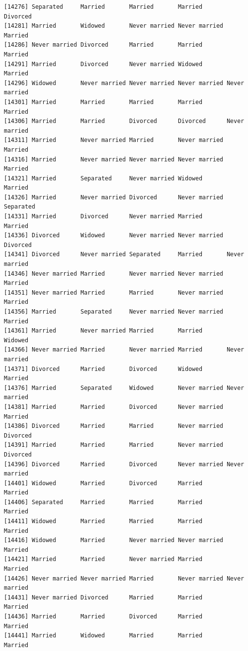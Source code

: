 \documentclass[
  letterpaper,
  DIV=11,
  numbers=noendperiod,
  oneside]{scrartcl}
\begin{document}
\begin{verbatim}
[14276] Separated     Married       Married       Married       Divorced     
[14281] Married       Widowed       Never married Never married Married      
[14286] Never married Divorced      Married       Married       Married      
[14291] Married       Divorced      Never married Widowed       Married      
[14296] Widowed       Never married Never married Never married Never married
[14301] Married       Married       Married       Married       Married      
[14306] Married       Married       Divorced      Divorced      Never married
[14311] Married       Never married Married       Never married Married      
[14316] Married       Never married Never married Never married Married      
[14321] Married       Separated     Never married Widowed       Married      
[14326] Married       Never married Divorced      Never married Separated    
[14331] Married       Divorced      Never married Married       Married      
[14336] Divorced      Widowed       Never married Never married Divorced     
[14341] Divorced      Never married Separated     Married       Never married
[14346] Never married Married       Never married Never married Married      
[14351] Never married Married       Married       Never married Married      
[14356] Married       Separated     Never married Never married Married      
[14361] Married       Never married Married       Married       Widowed      
[14366] Never married Married       Never married Married       Never married
[14371] Divorced      Married       Divorced      Widowed       Married      
[14376] Married       Separated     Widowed       Never married Never married
[14381] Married       Married       Divorced      Never married Married      
[14386] Divorced      Married       Married       Never married Divorced     
[14391] Married       Married       Married       Never married Divorced     
[14396] Divorced      Married       Divorced      Never married Never married
[14401] Widowed       Married       Divorced      Married       Married      
[14406] Separated     Married       Married       Married       Married      
[14411] Widowed       Married       Married       Married       Married      
[14416] Widowed       Married       Never married Never married Married      
[14421] Married       Married       Never married Married       Married      
[14426] Never married Never married Married       Never married Never married
[14431] Never married Divorced      Married       Married       Married      
[14436] Married       Married       Divorced      Married       Married      
[14441] Married       Widowed       Married       Married       Married      

\end{verbatim}
\end{document}
